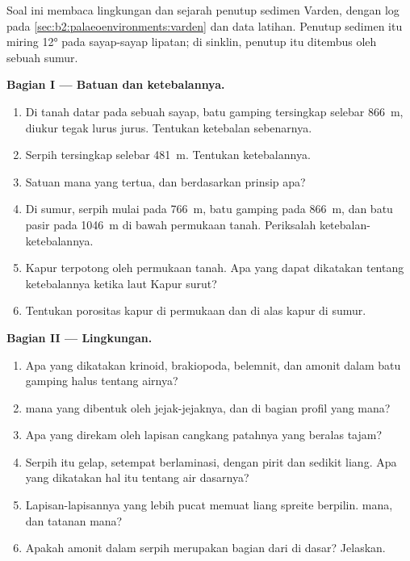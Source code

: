 \begin{problem}\label{pb:b2:palaeoenvironments:1}
Soal ini membaca lingkungan dan sejarah penutup sedimen Varden, dengan log pada
\cref{sec:b2:palaeoenvironments:varden} dan data latihan. Penutup sedimen itu miring
\ang{12} pada sayap-sayap lipatan; di sinklin, penutup itu ditembus oleh sebuah sumur.

\medskip\noindent\textbf{Bagian I --- Batuan dan ketebalannya.}
\begin{enumerate}
  \item Di tanah datar pada sebuah sayap, batu gamping tersingkap selebar \qty{866}{m}, diukur
        tegak lurus jurus. Tentukan ketebalan sebenarnya.
  \item Serpih tersingkap selebar \qty{481}{m}. Tentukan ketebalannya.
  \item Satuan mana yang tertua, dan berdasarkan prinsip apa?
  \item Di sumur, serpih mulai pada \qty{766}{m}, batu gamping pada \qty{866}{m}, dan
        batu pasir pada \qty{1046}{m} di bawah permukaan tanah. Periksalah ketebalan-ketebalannya.
  \item Kapur terpotong oleh permukaan tanah. Apa yang dapat dikatakan tentang ketebalannya ketika
        laut Kapur surut?
  \item Tentukan porositas kapur di permukaan dan di alas kapur di sumur.
\end{enumerate}

\medskip\noindent\textbf{Bagian II --- Lingkungan.}
\begin{enumerate}[resume]
  \item Apa yang dikatakan krinoid, brakiopoda, belemnit, dan amonit dalam batu gamping halus
        tentang airnya?
  \item {} mana yang dibentuk oleh jejak-jejaknya, dan di bagian profil yang mana?
  \item Apa yang direkam oleh lapisan cangkang patahnya yang beralas tajam?
  \item Serpih itu gelap, setempat berlaminasi, dengan pirit dan sedikit liang. Apa yang dikatakan hal itu
        tentang air dasarnya?
  \item Lapisan-lapisannya yang lebih pucat memuat liang spreite berpilin.  mana, dan tatanan mana?
  \item Apakah amonit dalam serpih merupakan bagian dari  di dasar? Jelaskan.
\end{enumerate}


\end{problem}
